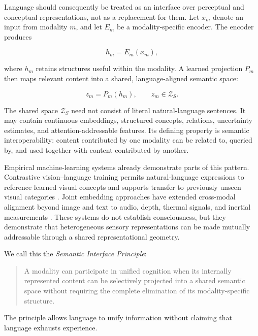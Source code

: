 Language should consequently be treated as an interface over perceptual and conceptual representations, not as a replacement for them. Let $x_m$ denote an input from modality $m$, and let $E_m$ be a modality-specific encoder. The encoder produces

\begin{equation}
h_m = E_m(x_m),
\label{eq:modality-encoding}
\end{equation}

where $h_m$ retains structures useful within the modality. A learned projection $P_m$ then maps relevant content into a shared, language-aligned semantic space:

\begin{equation}
z_m = P_m(h_m), \qquad z_m \in \mathcal{Z}_{S}.
\label{eq:semantic-projection}
\end{equation}

The shared space $\mathcal{Z}_{S}$ need not consist of literal natural-language sentences. It may contain continuous embeddings, structured concepts, relations, uncertainty estimates, and attention-addressable features. Its defining property is semantic interoperability: content contributed by one modality can be related to, queried by, and used together with content contributed by another.

Empirical machine-learning systems already demonstrate parts of this pattern. Contrastive vision--language training permits natural-language expressions to reference learned visual concepts and supports transfer to previously unseen visual categories \cite{radford2021clip}. Joint embedding approaches have extended cross-modal alignment beyond image and text to audio, depth, thermal signals, and inertial measurements \cite{girdhar2023imagebind}. These systems do not establish consciousness, but they demonstrate that heterogeneous sensory representations can be made mutually addressable through a shared representational geometry.

We call this the \emph{Semantic Interface Principle}:

\begin{quote}
A modality can participate in unified cognition when its internally represented content can be selectively projected into a shared semantic space without requiring the complete elimination of its modality-specific structure.
\end{quote}

The principle allows language to unify information without claiming that language exhausts experience.

